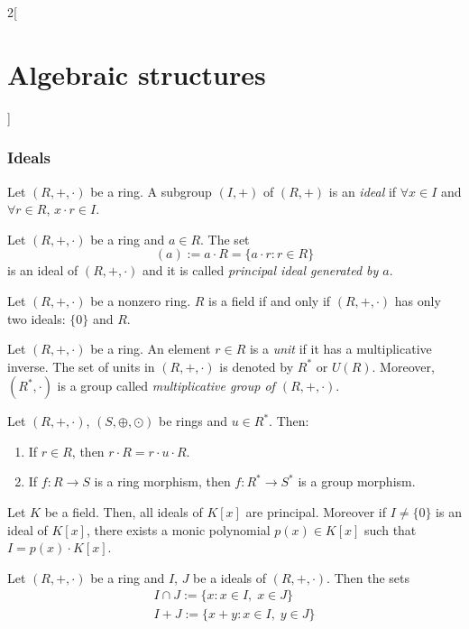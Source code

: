 \documentclass[../../../main.tex]{subfiles}
\begin{document}
\begin{multicols}{2}[\section{Algebraic structures}]
    \subsubsection*{Ideals}
    \begin{definition}[Ideal]
        Let $(R,+,\cdot)$ be a ring. A subgroup $(I,+)$ of $(R,+)$ is an \textit{ideal} if $\forall x\in I$ and $\forall r\in R$, $x\cdot r\in I$.
    \end{definition}
    \begin{lemma}
        Let $(R,+,\cdot)$ be a ring and $a\in R$. The set $$(a):=a\cdot R=\{a\cdot r:r\in R\}$$ is an ideal of $(R,+,\cdot)$ and it is called \textit{principal ideal generated by $a$}.
    \end{lemma}
    \begin{prop}
        Let $(R,+,\cdot)$ be a nonzero ring. $R$ is a field if and only if $(R,+,\cdot)$ has only two ideals: $\{0\}$ and $R$.
    \end{prop}
    \begin{definition}
        Let $(R,+,\cdot)$ be a ring. An element $r\in R$ is a \textit{unit} if it has a multiplicative inverse. The set of units in $(R,+,\cdot)$ is denoted by $R^*$ or $U(R)$. Moreover, $(R^*,\cdot)$ is a group called \textit{multiplicative group of $(R,+,\cdot)$}.
    \end{definition}
    \begin{lemma}
        Let $(R,+,\cdot)$, $(S,\oplus,\odot)$ be rings and $u\in R^*$. Then:
        \begin{enumerate}
            \item If $r\in R$, then $r\cdot R=r\cdot u\cdot R$.
            \item If $f:R\rightarrow S$ is a ring morphism, then $f:R^*\rightarrow S^*$ is a group morphism.
        \end{enumerate}
    \end{lemma}
    \begin{prop}
        Let $K$ be a field. Then, all ideals of $K[x]$ are principal. Moreover if $I\ne\{0\}$ is an ideal of $K[x]$, there exists a monic polynomial $p(x)\in K[x]$ such that $I=p(x)\cdot K[x]$.
    \end{prop}
    \begin{prop}
        Let $(R,+,\cdot)$ be a ring and $I$, $J$ be a ideals of $(R,+,\cdot)$. Then the sets
        \begin{gather*}
            I\cap J:=\{x:x\in I,\;x\in J\}\\
            I+J:=\{x+y:x\in I,\;y\in J\}\\

\end{gather*}
\end{prop}
\end{multicols}
\end{document}
